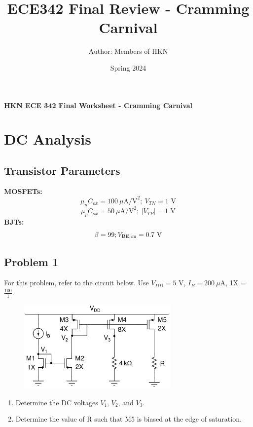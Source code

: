 \documentclass{article}
\title{ECE342 Final Review - Cramming Carnival}
\author{Author: Members of HKN}
\date{Spring 2024}
\begin{document}
\begin{center}
\textbf{
{\Large HKN ECE 342 Final Worksheet - Cramming Carnival}
}
\end{center} 
\noindent\makebox[\linewidth]{\rule{\linewidth}{0.2pt}}
\section*{DC Analysis}
\subsection*{Transistor Parameters}
\textbf{MOSFETs:}
$$\mu_nC_{ox} = 100\:\mu \text{A/V}^2; \ V_{TN} = 1\text{ V}$$
$$\mu_pC_{ox} = 50\:\mu \text{A/V}^2; \ |V_{TP}| = 1\text{ V}$$
\textbf{BJTs:}
$$\beta = 99; V_{\rm BE, on} = 0.7\text{ V}$$
\subsection*{Problem 1}
For this problem, refer to the circuit below. Use $V_{DD} = 5$ V, $I_B = 200\ \mu$A, 1X = $\frac{100}{1}$.
\begin{figure}[!htb]
\begin{center}
    \includegraphics[width=0.7\textwidth]{figures/cc_dc_2 (1).jpg}
\end{center}
\end{figure}
\begin{enumerate}[label=\textbf{(\alph*)}]
    \item Determine the DC voltages $V_1$, $V_2$, and $V_3$.
    \item Determine the value of R such that M5 is biased at the edge of saturation.
\end{enumerate}
\newpage
\end{document}
